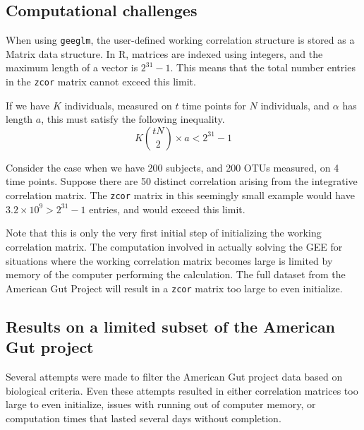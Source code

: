 \documentclass[12pt]{article}
\begin{document}




\subsection{Computational challenges}

When using \texttt{geeglm}, the user-defined working correlation structure is stored as a Matrix data structure. In R, matrices are indexed using integers, and the maximum length of a vector is $2^{31}-1$. This means that the total number entries in the \texttt{zcor} matrix cannot exceed this limit.

If we have $K$ individuals, measured on $t$ time points for $N$ individuals, and $\alpha$ has length $a$, this must satisfy the following inequality.
$$ K \binom{tN}{2} \times a < 2^{31}-1$$

Consider the case when we have 200 subjects, and 200 OTUs measured, on 4 time points. Suppose there are 50 distinct correlation arising from the integrative correlation matrix. The \texttt{zcor} matrix in this seemingly small example would have $3.2 \times 10^9 > 2^{31}-1$ entries, and would exceed this limit.

Note that this is only the very first initial step of initializing the working correlation matrix. The computation involved in actually solving the GEE for situations where the working correlation matrix becomes large is limited by memory of the computer performing the calculation. The full dataset from the American Gut Project will result in a \texttt{zcor} matrix too large to even initialize.

\subsection{Results on a limited subset of the American Gut project}

Several attempts were made to filter the American Gut project data based on biological criteria. Even these attempts resulted in either correlation matrices too large to even initialize, issues with running out of computer memory, or computation times that lasted several days without completion.
\end{document}
